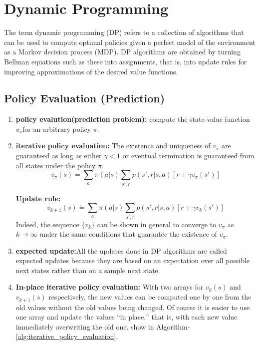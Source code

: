 
\chapter{Dynamic Programming}
\label{chap:ch_4_Dynamic_Programming}
The term dynamic programming (DP) refers to a collection of algorithms that can be used to compute optimal policies given a perfect model of the environment as a Markov decision process (MDP). DP algorithms are obtained by turning Bellman equations such as these into assignments, that is, into update rules for improving approximations of the desired value functions.

\section{Policy Evaluation (Prediction)}
\begin{enumerate}
	\item \textbf{policy evalution(prediction problem):} compute the state-value function $v_{\pi}$for an arbitrary policy $\pi$.
	\item \textbf{iterative policy evaluation:} The existence and uniqueness of $v_{\pi}$ are guaranteed as long as either $\gamma < 1$ or eventual termination is guaranteed from all states under the policy $\pi$.
	\begin{equation}
		v_{\pi}(s) \dot{=} \sum_{a}\pi(a|s)\sum_{s',r}p(s', r|s,a)[r + \gamma v_{\pi}(s')]
	\end{equation}

	\textbf{Update rule:}
	\begin{equation}
	\label{eq:policy_evaluation}
		v_{k+1}(s) \dot{=} \sum_{a}\pi(a|s)\sum_{s',r}p(s', r|s,a)[r + \gamma v_{k}(s')]
	\end{equation}
	Indeed, the sequence $\{v_k\}$ can be shown in general to converge to $v_{\pi}$ as $k \rightarrow \infty$ under the same conditions that guarantee the existence of $v_{\pi}$.

	\item \textbf{expected update:}All the updates done in DP algorithms are called expected updates because they are based on an expectation over all possible next states rather than on a sample next state.

	\item \textbf{In-place iterative policy evaluation:} With two arrays for $v_k(s)$ and $v_{k+1}(s)$ respectively, the new values can be computed one by one from the old values without the old values being changed. Of course it is easier to use one array and update the values “in place,” that is, with each new value immediately overwriting the old one. show in Algorithm-\ref{alg:iterative_policy_evaluation}.
\end{enumerate}

